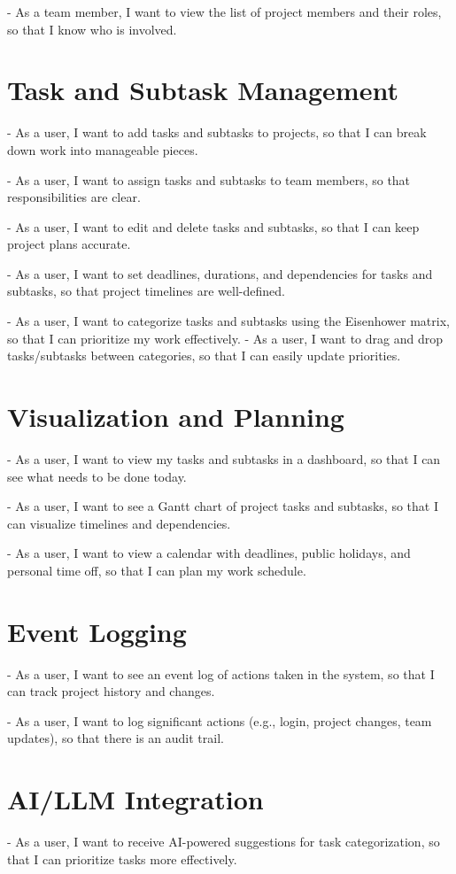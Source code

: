 \documentclass{report}
\begin{document}
- As a team member, I want to view the list of project members and their roles, so that I know who is involved.

\section{Task and Subtask Management}
- As a user, I want to add tasks and subtasks to projects, so that I can break down work into manageable pieces.

- As a user, I want to assign tasks and subtasks to team members, so that responsibilities are clear.

- As a user, I want to edit and delete tasks and subtasks, so that I can keep project plans accurate.

- As a user, I want to set deadlines, durations, and dependencies for tasks and subtasks, so that project timelines are well-defined.

- As a user, I want to categorize tasks and subtasks using the Eisenhower matrix, so that I can prioritize my work effectively.
- As a user, I want to drag and drop tasks/subtasks between categories, so that I can easily update priorities.

\section{Visualization and Planning}
- As a user, I want to view my tasks and subtasks in a dashboard, so that I can see what needs to be done today.

- As a user, I want to see a Gantt chart of project tasks and subtasks, so that I can visualize timelines and dependencies.

- As a user, I want to view a calendar with deadlines, public holidays, and personal time off, so that I can plan my work schedule.

\section{Event Logging}
- As a user, I want to see an event log of actions taken in the system, so that I can track project history and changes.

- As a user, I want to log significant actions (e.g., login, project changes, team updates), so that there is an audit trail.

\section{AI/LLM Integration}
- As a user, I want to receive AI-powered suggestions for task categorization, so that I can prioritize tasks more effectively.
\end{document}
